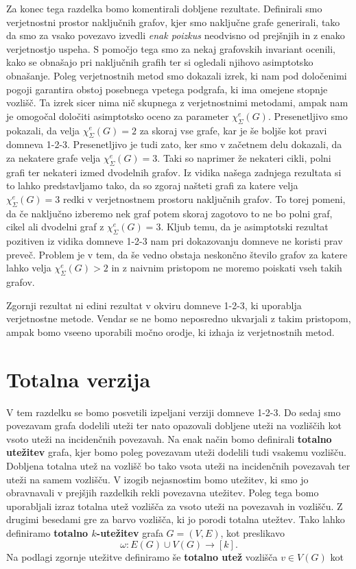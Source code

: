 \documentclass[12pt,a4paper,twoside]{article}
\theoremstyle{definition} %
\theoremstyle{plain} %
\newcommand{\ec}{\chi_{\Sigma}^e}
\numberwithin{equation}{section}  %
\begin{document}
Za konec tega razdelka bomo komentirali dobljene rezultate. Definirali smo verjetnostni prostor naključnih grafov, kjer smo naključne grafe generirali, tako da smo za vsako povezavo izvedli \textit{enak poizkus} neodvisno od prejšnjih in z enako verjetnostjo uspeha. S pomočjo tega smo za nekaj grafovskih invariant ocenili, kako se obnašajo pri naključnih grafih ter si ogledali njihovo asimptotsko obnašanje. Poleg verjetnostnih metod smo dokazali izrek, ki nam pod določenimi pogoji garantira obstoj posebnega vpetega podgrafa, ki ima omejene stopnje vozlišč. Ta izrek sicer nima nič skupnega z verjetnostnimi metodami, ampak nam je omogočal določiti asimptotsko oceno za parameter $\ec(G)$. Presenetljivo smo pokazali, da velja $\ec(G) = 2$ za skoraj vse grafe, kar je še boljše kot pravi domneva 1-2-3. Presenetljivo je tudi zato, ker smo v začetnem delu dokazali, da za nekatere grafe velja $\ec(G) = 3$. Taki so naprimer že nekateri cikli, polni grafi ter nekateri izmed dvodelnih grafov. Iz vidika našega zadnjega rezultata si to lahko predstavljamo tako, da so zgoraj našteti grafi za katere velja $\ec(G) = 3$ redki v verjetnostnem prostoru naključnih grafov. To torej pomeni, da če naključno izberemo nek graf potem skoraj zagotovo to ne bo polni graf, cikel ali dvodelni graf z $\ec(G) = 3$. Kljub temu, da je asimptotski rezultat pozitiven iz vidika domneve 1-2-3 nam pri dokazovanju domneve ne koristi prav preveč. Problem je v tem, da še vedno obstaja neskončno število grafov za katere lahko velja $\ec(G) > 2$ in z naivnim pristopom ne moremo poiskati vseh takih grafov.

Zgornji rezultat ni edini rezultat v okviru domneve 1-2-3, ki uporablja verjetnostne metode. Vendar se ne bomo neposredno ukvarjali z takim pristopom, ampak bomo vseeno uporabili močno orodje, ki izhaja iz verjetnostnih metod.

\section{Totalna verzija}
V tem razdelku se bomo posvetili izpeljani verziji domneve 1-2-3. Do sedaj smo povezavam grafa dodelili uteži ter nato opazovali dobljene uteži na vozliščih kot vsoto uteži na incidenčnih povezavah. Na enak način bomo definirali \textbf{totalno utežitev} grafa, kjer bomo poleg povezavam uteži dodelili tudi vsakemu vozlišču. Dobljena totalna utež na vozlišč bo tako vsota uteži na incidenčnih povezavah ter uteži na samem vozlišču. V izogib nejasnostim bomo utežitev, ki smo jo obravnavali v prejšjih razdelkih rekli povezavna utežitev. Poleg tega bomo uporabljali izraz totalna utež vozlišča za vsoto uteži na povezavah in vozlišču. Z drugimi besedami gre za barvo vozlišča, ki jo porodi totalna utežtev. Tako lahko definiramo \textbf{totalno $k$-utežitev} grafa $G=(V,E)$, kot preslikavo
$$ \omega : E(G) \cup V(G) \rightarrow [k]. $$
Na podlagi zgornje utežitve definiramo še \textbf{totalno utež} vozlišča $v \in V(G)$ kot
\end{document}
